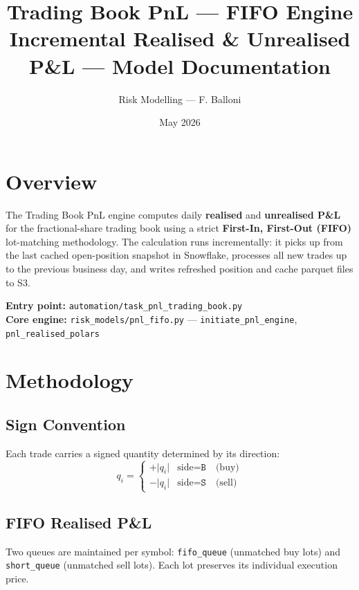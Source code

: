 \documentclass[11pt, a4paper]{article}
\title{\textbf{Trading Book PnL — FIFO Engine}\\[4pt]
\large Incremental Realised \& Unrealised P\&L --- Model Documentation}
\author{Risk Modelling --- F. Balloni}
\date{May 2026}
\begin{document}
\maketitle

\section{Overview}

The Trading Book PnL engine computes daily \textbf{realised} and
\textbf{unrealised P\&L} for the fractional-share trading book using a
strict \textbf{First-In, First-Out (FIFO)} lot-matching methodology.
The calculation runs incrementally: it picks up from the last cached
open-position snapshot in Snowflake, processes all new trades up to
the previous business day, and writes refreshed position and cache
parquet files to S3.

\textbf{Entry point:} \texttt{automation/task\_pnl\_trading\_book.py} \\
\textbf{Core engine:} \texttt{risk\_models/pnl\_fifo.py} ---
\texttt{initiate\_pnl\_engine}, \texttt{pnl\_realised\_polars}

\section{Methodology}

\subsection{Sign Convention}

Each trade carries a signed quantity determined by its direction:
\begin{equation}
  q_i =
  \begin{cases}
    +\lvert q_i \rvert & \text{side} = \texttt{B} \quad\text{(buy)}\\
    -\lvert q_i \rvert & \text{side} = \texttt{S} \quad\text{(sell)}
  \end{cases}
\end{equation}

\subsection{FIFO Realised P\&L}

Two queues are maintained per symbol: \texttt{fifo\_queue} (unmatched
buy lots) and \texttt{short\_queue} (unmatched sell lots). Each lot
preserves its individual execution price.
\end{document}
